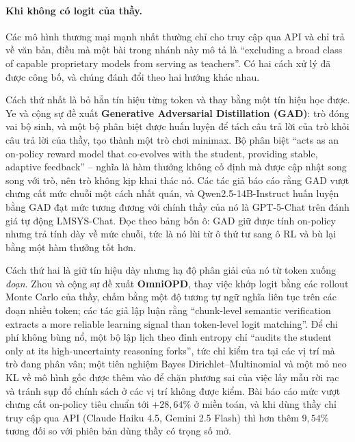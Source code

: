 \paragraph{Khi không có logit của thầy.} Các mô hình thương mại mạnh nhất thường chỉ cho truy cập qua API và chỉ trả về văn bản, điều mà một bài trong nhánh này mô tả là ``excluding a broad class of capable proprietary models from serving as teachers''. Có hai cách xử lý đã được công bố, và chúng đánh đổi theo hai hướng khác nhau.

Cách thứ nhất là bỏ hẳn tín hiệu từng token và thay bằng một tín hiệu học được. Ye và cộng sự \cite{ye2025gad} đề xuất \textbf{Generative Adversarial Distillation (GAD)}: trò đóng vai bộ sinh, và một bộ phân biệt được huấn luyện để tách câu trả lời của trò khỏi câu trả lời của thầy, tạo thành một trò chơi minimax. Bộ phân biệt ``acts as an on-policy reward model that co-evolves with the student, providing stable, adaptive feedback'' -- nghĩa là hàm thưởng không cố định mà được cập nhật song song với trò, nên trò không kịp khai thác nó. Các tác giả báo cáo rằng GAD vượt chưng cất mức chuỗi một cách nhất quán, và Qwen2.5-14B-Instruct huấn luyện bằng GAD đạt mức tương đương với chính thầy của nó là GPT-5-Chat trên đánh giá tự động LMSYS-Chat. Đọc theo bảng bốn ô: GAD giữ được tính on-policy nhưng trả tính dày về mức chuỗi, tức là nó lùi từ ô thứ tư sang ô RL và bù lại bằng một hàm thưởng tốt hơn.

Cách thứ hai là giữ tín hiệu dày nhưng hạ độ phân giải của nó từ token xuống \emph{đoạn}. Zhou và cộng sự \cite{zhou2026omniopd} đề xuất \textbf{OmniOPD}, thay việc khớp logit bằng các rollout Monte Carlo của thầy, chấm bằng một độ tương tự ngữ nghĩa liên tục trên các đoạn nhiều token; các tác giả lập luận rằng ``chunk-level semantic verification extracts a more reliable learning signal than token-level logit matching''. Để chi phí không bùng nổ, một bộ lập lịch theo đỉnh entropy chỉ ``audits the student only at its high-uncertainty reasoning forks'', tức chỉ kiểm tra tại các vị trí mà trò đang phân vân; một tiên nghiệm Bayes Dirichlet--Multinomial và một mỏ neo KL về mô hình gốc được thêm vào để chặn phương sai của việc lấy mẫu rời rạc và tránh sụp đổ chính sách ở các vị trí không được kiểm. Bài báo cáo mức vượt chưng cất on-policy tiêu chuẩn tới $+28{,}64\%$ ở miền toán, và khi dùng thầy chỉ truy cập qua API (Claude Haiku 4.5, Gemini 2.5 Flash) thì hơn thêm $9{,}54\%$ tương đối so với phiên bản dùng thầy có trọng số mở.

